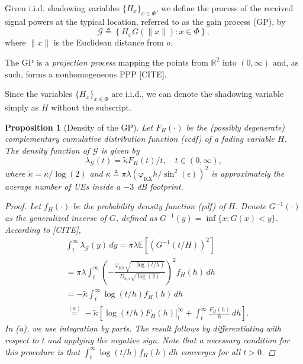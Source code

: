\documentclass[lettersize,journal]{IEEEtran}
\newtheorem{prop}[theorem]{Proposition}
\begin{document}
         
Given i.i.d. shadowing variables $\{H_x\}_{x \in \Phi}$, we define the process of the received signal powers at the typical location, referred to as the gain process (GP), by
\begin{equation}
  \label{eq:gainprocess}
  \mathcal{G} \triangleq \left\{ H_x G(\|x\|) : x \in \Phi \right\},
\end{equation}
where $\|x\|$ is the Euclidean distance from $\textit{o}$. 

The GP is a \textit{projection process} mapping the points from $\mathbb{R}^2$ into $(0,\infty)$ and, as such, forms a nonhomogeneous PPP [CITE].



Since the variables $\{H_x\}_{x \in \Phi}$ are i.i.d., we can denote the shadowing variable simply as $H$ without the subscript.
\begin{prop}[Density of the GP]
  Let $F_H(\cdot)$ be the (possibly degenerate) complementary cumulative distribution function (ccdf) of a fading variable $H$. The density function of $\mathcal{G}$ is given by
  \begin{equation}
    \label{eq:GPdensity}
    \lambda_{\mathcal{G}}(t) = \tilde{\kappa} {F_H(t)}/{t}, \quad t \in (0, \infty),
  \end{equation}
  where $\tilde{\kappa} = {\kappa}/{\log(2)}$ and $\kappa \triangleq \pi \lambda \left({\varphi_{\text{RX}}}h/{\sin^2(\epsilon)}\right)^2$ is approximately the average number of UEs inside a $-3$ dB footprint.

  
  \begin{proof}
    Let $f_H(\cdot)$ be the probability density function (pdf) of $H$. Denote $G^{-1}(\cdot)$ as the generalized inverse of $G$, defined as $G^{-1}(y) = \inf \{x : G(x) < y\}$. According to [CITE],
    \begin{align*}
      &\int_t^{\infty} \lambda_{\mathcal{G}}(y) \, dy = \pi \lambda \mathbb{E}\left[ \left({G^{-1}(t/H)}{}\right)^2 \right] \\
      &= \pi \lambda \int_t^{\infty} \left(-\frac{\varphi_{\text{RX}} \sqrt{-\log(t/h)}}{D_{h,\epsilon} \sqrt{\log(2)}}\right)^2 f_H(h) \, dh \\
      &= -\tilde{\kappa} \int_t^{\infty} \log(t/h) f_H(h) \, dh \\
      &\overset{(a)}{=} -\tilde{\kappa} \left[ \left. \log(t/h) F_H(h) \right|_t^{\infty} + \int_t^{\infty} \frac{F_H(h)}{h} \, dh \right].
    \end{align*}
    In (a), we use integration by parts. The result follows by differentiating with respect to $t$ and applying the negative sign. Note that a necessary condition for this procedure is that $\int_t^{\infty} \log(t/h) f_H(h) \, dh$ converges for all $t > 0$.
  \end{proof}
\end{prop}
\end{document}
